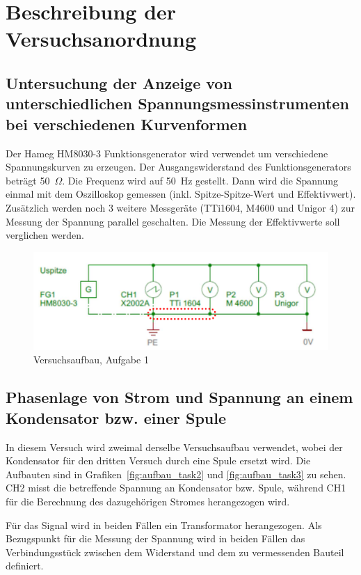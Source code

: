 \documentclass{article}
\begin{document}
\section{Beschreibung der Versuchsanordnung}


\subsection{Untersuchung  der  Anzeige  von  unterschiedlichen  Spannungsmessinstrumenten  bei verschiedenen Kurvenformen}
\label{subsec:aufbau_task1}

Der Hameg HM8030-3 Funktionsgenerator wird verwendet um verschiedene Spannungskurven zu erzeugen. Der Ausgangswiderstand des Funktionsgenerators beträgt 50~$\Omega$. Die Frequenz wird auf 50~Hz gestellt. Dann wird die Spannung einmal mit dem Oszilloskop gemessen (inkl. Spitze-Spitze-Wert und Effektivwert). Zusätzlich werden noch 3 weitere Messgeräte (TTi1604, M4600 und Unigor 4) zur Messung der Spannung parallel geschalten. Die Messung der Effektivwerte soll verglichen werden.


\begin{figure}[H]
\centering
\caption{Versuchsaufbau, Aufgabe 1}
\label{fig:aufbau_task1}
\includegraphics[scale=1]{bilder/aufbau_task1.png}
\end{figure}


\subsection{Phasenlage von Strom und Spannung an einem Kondensator bzw. einer Spule}

In diesem Versuch wird zweimal derselbe Versuchsaufbau verwendet, wobei der Kondensator für den dritten Versuch durch eine Spule ersetzt wird. Die Aufbauten sind in Grafiken~\ref{fig:aufbau_task2} und \ref{fig:aufbau_task3} zu sehen. CH2 misst die betreffende Spannung an Kondensator bzw. Spule, während CH1 für die Berechnung des dazugehörigen Stromes herangezogen wird.

Für das Signal wird in beiden Fällen ein Transformator herangezogen. Als Bezugspunkt für die Messung der Spannung wird in beiden Fällen das Verbindungsstück zwischen dem Widerstand und dem zu vermessenden Bauteil definiert.
\end{document}
